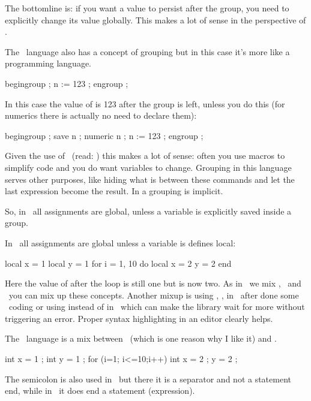 \starttyping
\bgroup
\endgroup
\stoptyping

The bottomline is: if you want a value to persist after the group, you need to
explicitly change its value globally. This makes a lot of sense in the perspective
of \TEX.

\stopsectionlevel

\startsectionlevel[title=\METAPOST]

The \METAPOST\ language also has a concept of grouping but in this case it's more like a
programming language.

\starttyping
begingroup ;
    n := 123 ;
engroup ;
\stoptyping

In this case the value of  is 123 after the group is left, unless you do
this (for numerics there is actually no need to declare them):

\starttyping
begingroup ;
    save n ; numeric n ; n := 123 ;
engroup ;
\stoptyping

Given the use of \METAPOST\ (read: \METAFONT) this makes a lot of sense: often
you use macros to simplify code and you do want variables to change. Grouping in
this language serves other purposes, like hiding what is between these commands
and let the last expression become the result. In a  grouping is
implicit.

So, in \METAPOST\ all assignments are global, unless a variable is explicitly
saved inside a group.

\stopsectionlevel

\startsectionlevel[title=\LUA]

In \LUA\ all assignments are global unless a variable is defines local:

\starttyping
local x = 1
local y = 1
for i = 1, 10 do
    local x = 2
    y = 2
end
\stoptyping

Here the value of  after the loop is still one but  is now two.
As in \LUATEX\ we mix \TEX, \METAPOST\ and \LUA\ you can mix up these concepts.
Another mixup is using \type {:=}, ,  in \LUA\ after done
some \METAPOST\ coding or using  instead of  in
\METAPOST\ which can make the library wait for more without triggering an error.
Proper syntax highlighting in an editor clearly helps.

\stopsectionlevel

\startsectionlevel[title=\CCODE]

The \LUA\ language is a mix between \PASCAL\ (which is one reason why I like it)
and \CCODE.

\starttyping
int x = 1 ;
int y = 1 ;
for (i=1; i<=10;i++) {
    int x = 2 ;
    y = 2 ;
}
\stoptyping

The semicolon is also used in \PASCAL\ but there it is a separator and not a
statement end, while in \METAPOST\ it does end a statement (expression).

\stopsectionlevel

\stopdocument
